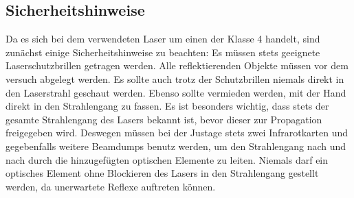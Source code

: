 \documentclass[twoside,        %
               BCOR12mm,       %
               english,ngerman, %
               fleqn,headsepline=false,footsepline=false
              ]{Vorlage/MFPREPORT}
\begin{document}
\subsection{Sicherheitshinweise}
Da es sich bei dem verwendeten Laser um einen der Klasse 4 handelt, sind
zunächst einige Sicherheitshinweise zu beachten: Es müssen stets geeignete
Laserschutzbrillen getragen werden. Alle reflektierenden Objekte müssen vor dem
versuch abgelegt werden. Es sollte auch trotz der Schutzbrillen niemals direkt
in den Laserstrahl geschaut werden. Ebenso sollte vermieden werden, mit der
Hand direkt in den Strahlengang zu fassen. Es ist besonders wichtig, dass stets
der gesamte Strahlengang des Lasers bekannt ist, bevor dieser zur Propagation
freigegeben wird. Deswegen müssen bei der Justage stets zwei Infrarotkarten und
gegebenfalls weitere Beamdumps benutz werden, um den Strahlengang nach und nach
durch die hinzugefügten optischen Elemente zu leiten. Niemals darf ein
optisches Element ohne Blockieren des Lasers in den Strahlengang gestellt
werden, da unerwartete Reflexe auftreten können.\\
\end{document}
